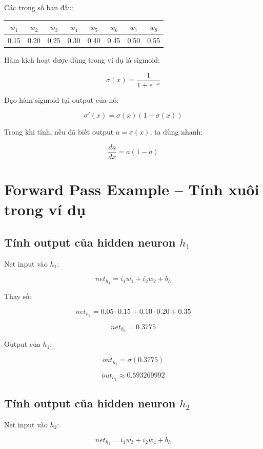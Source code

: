 Các trọng số ban đầu:

\begin{center}
\begin{tabular}{cccccccc}
\toprule
$w_1$ & $w_2$ & $w_3$ & $w_4$ & $w_5$ & $w_6$ & $w_7$ & $w_8$ \\
\midrule
0.15 & 0.20 & 0.25 & 0.30 & 0.40 & 0.45 & 0.50 & 0.55 \\
\bottomrule
\end{tabular}
\end{center}

Hàm kích hoạt được dùng trong ví dụ là sigmoid:

\[
    \sigma(x)=\frac{1}{1+e^{-x}}
\]

Đạo hàm sigmoid tại output của nó:

\[
    \sigma'(x)=\sigma(x)\left(1-\sigma(x)\right)
\]

Trong khi tính, nếu đã biết output $a=\sigma(x)$, ta dùng nhanh:

\[
    \frac{da}{dx}=a(1-a)
\]

\section{Forward Pass Example -- Tính xuôi trong ví dụ}

\subsection{Tính output của hidden neuron $h_1$}

Net input vào $h_1$:

\[
    net_{h_1}=i_1w_1+i_2w_2+b_h
\]

Thay số:

\[
    net_{h_1}
    =
    0.05\cdot 0.15
    +
    0.10\cdot 0.20
    +
    0.35
\]

\[
    net_{h_1}=0.3775
\]

Output của $h_1$:

\[
    out_{h_1}=\sigma(0.3775)
\]

\[
    out_{h_1}\approx 0.593269992
\]

\subsection{Tính output của hidden neuron $h_2$}

Net input vào $h_2$:

\[
    net_{h_2}=i_1w_3+i_2w_4+b_h
\]

